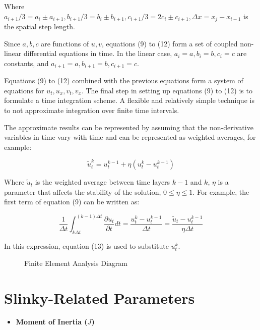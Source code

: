\documentclass{mcmthesis}  %
\begin{document}
\begin{appendices}
Where $a_{i+1}/3 = a_i \pm a_{i+1}, b_{i+1}/3 = b_i \pm b_{i+1}, c_{i+1}/3 = 2c_i \pm c_{i+1}, \Delta x = x_j - x_{i-1}$ is the spatial step length.

Since $a, b, c$ are functions of $u, v$, equations (9) to (12) form a set of coupled non-linear differential equations in time. In the linear case, $a_i = a, b_i = b, c_i = c$ are constants, and $a_{i+1} = a, b_{i+1} = b, c_{i+1} = c$.

Equations (9) to (12) combined with the previous equations form a system of equations for $u_t, u_x, v_t, v_x$. The final step in setting up equations (9) to (12) is to formulate a time integration scheme. A flexible and relatively simple technique is to not approximate integration over finite time intervals.

The approximate results can be represented by assuming that the non-derivative variables in time vary with time and can be represented as weighted averages, for example:

\begin{equation}
\tilde{u}_t^k = u_t^{k-1} + \eta(u_t^k - u_t^{k-1})
\end{equation}

Where $\tilde{u}_t$ is the weighted average between time layers $k-1$ and $k$, $\eta$ is a parameter that affects the stability of the solution, $0 \leq \eta \leq 1$. For example, the first term of equation (9) can be written as:

\begin{equation}
\frac{1}{\Delta t} \int_{k\Delta t}^{(k-1)\Delta t} \frac{\partial u_t}{\partial t} dt = \frac{u_t^k - u_t^{k-1}}{\Delta t} = \frac{\tilde{u}_t - u_t^{k-1}}{\eta \Delta t}
\end{equation}

In this expression, equation (13) is used to substitute $u_t^k$.

\begin{figure}[h!]
    \centering
    \caption{Finite Element Analysis Diagram}
    \label{fig:finite_element_analysis}
\end{figure}

\section{Slinky-Related Parameters}  %

\begin{itemize}
    \item \textbf{Moment of Inertia ($J$)}
    

\end{itemize}
\end{appendices}
\end{document}
